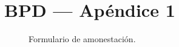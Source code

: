 \appendix
\pagestyle{formato}
\renewcommand{\Codigo}{BPD-PROG}
\renewcommand{\FechaPub}{2023-01}
\renewcommand{\Edit}{03}
\renewcommand{\Titulo}{BPD --- Apéndice 1}

\section{\Titulo}
\label{AP1}
\begin{figure}[h!]
	\centering
    \label{F-amonest}
	\caption{Formulario de amonestación.}
\end{figure}